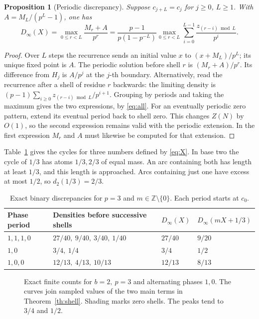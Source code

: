 \documentclass[11pt]{article}
\newtheorem{proposition}[theorem]{Proposition}
\newcommand{\Z}{\mathbb Z}
\begin{document}
\begin{proposition}[Periodic discrepancy]\label{th:periodic}
Suppose \(c_{j+L}=c_j\) for \(j\ge0\), \(L\ge1\). With \(A=M_L/(p^L-1)\), one has
\[
 D_\infty(X)=\max_{0\le r<L}\frac{M_r+A}{p^r}
 =\frac{p-1}{p(1-p^{-L})}\max_{0\le r<L}
      \sum_{i=0}^{L-1}\frac{z_{(r-i)\bmod L}}{p^i}.
\]
\end{proposition}
\begin{proof}
Over \(L\) steps the recurrence sends an initial value \(x\) to \((x+M_L)/p^L\); its unique fixed point is \(A\). The periodic solution before shell \(r\) is \((M_r+A)/p^r\). Its difference from \(H_j\) is \(A/p^j\) at the \(j\)-th boundary. Alternatively, read the recurrence after a shell of residue \(r\) backwards: the limiting density is \((p-1)\sum_{i\ge0}z_{(r-i)\bmod L}/p^{i+1}\). Grouping by periods and taking the maximum gives the two expressions, by \eqref{eq:all}. For an eventually periodic zero pattern, extend its eventual period back to shell zero. This changes \(Z(N)\) by \(O(1)\), so the second expression remains valid with the periodic extension. In the first expression \(M_r\) and \(A\) must likewise be computed for that extension.
\end{proof}

Table~\ref{tab:cycles} gives the cycles for three numbers defined by \eqref{eq:X}. In base two the cycle of \(1/3\) has atoms \(1/3,2/3\) of equal mass. An arc containing both has length at least \(1/3\), and this length is approached. Arcs containing just one have excess at most \(1/2\), so \(d_2(1/3)=2/3\).
\begin{table}[htbp]\centering
\begin{tabular}{llll}
\toprule
Phase period & Densities before successive shells & \(D_\infty(X)\) & \(D_\infty(mX+1/3)\)\\
\midrule
\(1,1,1,0\) & \(27/40,\ 9/40,\ 3/40,\ 1/40\) & \(27/40\) & \(9/20\)\\
\(1,0\) & \(3/4,\ 1/4\) & \(3/4\) & \(1/2\)\\
\(1,0,0\) & \(12/13,\ 4/13,\ 10/13\) & \(12/13\) & \(8/13\)\\
\bottomrule
\end{tabular}
\caption{Exact binary discrepancies for \(p=3\) and \(m\in\Z\setminus\{0\}\). Each period starts at \(c_0\).}\label{tab:cycles}
\end{table}
\begin{figure}[htbp]\centering

\caption{Exact finite counts for \(b=2,\ p=3\) and alternating phases \(1,0\). The curves join sampled values of the two main terms in Theorem~\ref{th:shell}. Shading marks zero shells. The peaks tend to \(3/4\) and \(1/2\).}\label{fig:prefix}
\end{figure}
\end{document}
